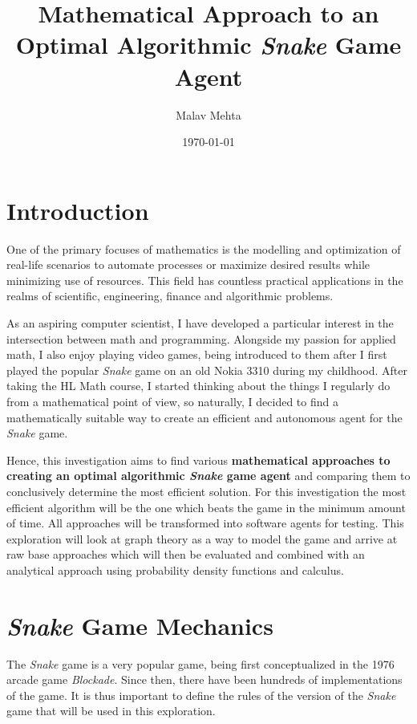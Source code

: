 \documentclass[12pt]{article}
\title{Mathematical Approach to an Optimal Algorithmic \textit{Snake} Game Agent}
\author{Malav Mehta}
\date{\today}
\begin{document}
\begin{singlespace}
\maketitle
\thispagestyle{empty}
\tableofcontents
\end{singlespace}

\clearpage
\setcounter{page}{1}
\pagebreak


\section{Introduction}

One of the primary focuses of mathematics is the modelling and optimization of real-life scenarios to automate processes or maximize desired results while minimizing use of resources. This field has countless practical applications in the realms of scientific, engineering, finance and algorithmic problems.

As an aspiring computer scientist, I have developed a particular interest in the intersection between math and programming. Alongside my passion for applied math, I also enjoy playing video games, being introduced to them after I first played the popular \textit{Snake} game on an old Nokia 3310 during my childhood. After taking the HL Math course, I started thinking about the things I regularly do from a mathematical point of view, so naturally, I decided to find a mathematically suitable way to create an efficient and autonomous agent for the \textit{Snake} game.

Hence, this investigation aims to find various \textbf{mathematical approaches to creating an optimal algorithmic \textit{Snake} game agent} and comparing them to conclusively determine the most efficient solution. For this investigation the most efficient algorithm will be the one which beats the game in the minimum amount of time. All approaches will be transformed into software agents for testing. This exploration will look at graph theory as a way to model the game and arrive at raw base approaches which will then be evaluated and combined with an analytical approach using probability density functions and calculus. 

\section{\textit{Snake} Game Mechanics}

The \textit{Snake} game is a very popular game, being first conceptualized in  the 1976 arcade game \textit{Blockade}. Since then, there have been hundreds of implementations of the game. It is thus important to define the rules of the version of the \textit{Snake} game that will be used in this exploration.
\end{document}
